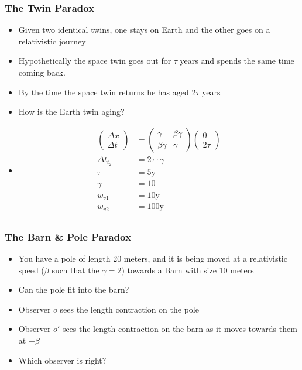 \documentclass[12pt,letterpaper, twocolumn]{article}
\begin{document}
\subsubsection*{The Twin Paradox}
\begin{itemize}
    \item Given two identical twins, one stays on Earth and the other goes on a relativistic journey
    \item Hypothetically the space twin goes out for $\tau$ years and spends the same time coming back.
    \item By the time the space twin returns he has aged $2\tau$ years
    \item How is the Earth twin aging? 
    \item \begin{align*}
        \begin{pmatrix}\Delta x\\ \Delta t\end{pmatrix} &= \begin{pmatrix}\gamma & \beta \gamma\\ \beta \gamma & \gamma\end{pmatrix}\begin{pmatrix}0\\2\tau\end{pmatrix}\\
        \Delta t_{t_2} &= 2\tau \cdot \gamma\\
        \tau &= 5\text{y}\\
        \gamma &= 10\\
        w_{v1} &= 10\text{y}\\
        w_{v2} &= 100\text{y}\\
    \end{align*}
\end{itemize}

\subsubsection*{The Barn \& Pole Paradox}
\begin{itemize}
    \item You have a pole of length 20 meters, and it is being moved at a relativistic speed ($\beta$ such that the $\gamma = 2$) towards a Barn with size 10 meters
    \item Can the pole fit into the barn?
    \item Observer $o$ sees the length contraction on the pole
    \item Observer $o'$ sees the length contraction on the barn as it moves towards them at $-\beta$
    \item Which observer is right? 
\end{itemize}
\end{document}
